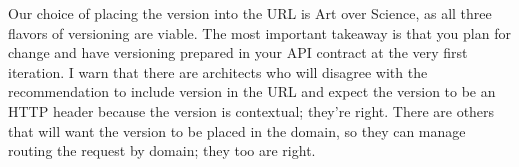 Our choice of placing the version into the URL is Art over Science, as all three flavors of versioning are viable.  The most important takeaway is that you plan for change and have versioning prepared in your API contract at the very first iteration.  I warn that there are architects who will disagree with the recommendation to include version in the URL and expect the version to be an HTTP header because the version is contextual; they're right.  There are others that will want the version to be placed in the domain, so they can manage routing the request by domain; they too are right.

